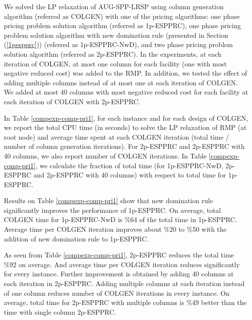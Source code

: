 We solved the LP relaxation of AUG-SPP-LRSP using column generation algorithm
(referred as COLGEN) with one of the pricing algorithms: one phase pricing problem
solution algorithm (referred as 1p-ESPPRC), one phase pricing problem solution algorithm
with new domination rule (presented in Section (\ref{1pespprc})) (referred as 1p-ESPPRC-NwD),
and two phase pricing problem solution algorithm (referred as 2p-ESPPRC). In the experiments,
at each iteration of COLGEN, at most one column for each facility (one with most negative
reduced cost) was added to the RMP. In addition, we tested the effect of adding multiple
columns instead of at most one at each iteration of COLGEN. We added at most 40 columns
with most negative reduced cost for each facility at each iteration of COLGEN with 2p-ESPPRC.

In Table \ref{compexp-comp-pri1}, for each instance and for each design of COLGEN,
we report the total CPU time (in seconds) to solve the LP relaxation of RMP (at root node)
and average time spent at each COLGEN iteration (total time / number of column generation
iterations). For 2p-ESPPRC and 2p-ESPPRC with 40
columns, we also report number of COLGEN iterations. In Table \ref{compexp-comp-pri1},
we calculate the fraction of total time (for 1p-ESPPRC-NwD, 2p-ESPPRC and 2p-ESPPRC with 40
columns) with respect to total time for 1p-ESPPRC.

Results on Table \ref{compexp-comp-pri1} show that new domination rule significantly
improves the performance of 1p-ESPPRC. On average, total COLGEN time for 1p-ESPPRC-NwD is
\%64 of the total time in 1p-ESPPRC.  Average time per COLGEN iteration improves
about \%20 to \%50 with the addition of new domination rule to 1p-ESPPRC.

As seen from Table \ref{compexp-comp-pri1}, 2p-ESPPRC reduces the total time \%92 on
average. And average time per COLGEN iteration reduces significantly for every instance.
Further improvement is obtained by adding 40 columns at each iteration
in 2p-ESPPRC. Adding multiple columns at each iteration instead of one column reduces number of
COLGEN iterations in every instance. On average, total time for 2p-ESPPRC with multiple columns
is \%49 better than the time with single column 2p-ESPPRC.

